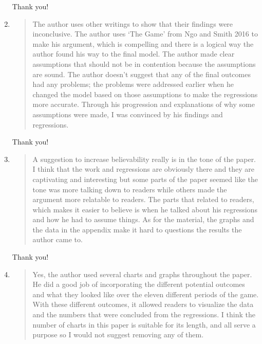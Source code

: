 \documentclass{article}
\newenvironment{itquote}
	{\begin{quote}\itshape}
	{\end{quote}\ignorespacesafterend}
\begin{document}
\begin{enumerate}
\begin{itquote}
				\end{itquote}

				Thank you!

			\item
				
				\begin{itquote}
			
					The author uses other writings to show that their findings were inconclusive. The author uses ‘The Game' from Ngo and Smith 2016 to make his argument, which is compelling and there is a logical way the author found his way to the final model. The author made clear assumptions that should not be in contention because the assumptions are sound. The author doesn't suggest that any of the final outcomes had any problems; the problems were addressed earlier when he changed the model based on those assumptions to make the regressions more accurate. Through his progression and explanations of why some assumptions were made, I was convinced by his findings and regressions.

				\end{itquote}

				Thank you!

			\item
				
				\begin{itquote}
			
					A suggestion to increase believability really is in the tone of the paper. I think that the work and regressions are obviously there and they are captivating and interesting but some parts of the paper seemed like the tone was more talking down to readers while others made the argument more relatable to readers. The parts that related to readers, which makes it easier to believe is when he talked about his regressions and how he had to assume things. As for the material, the graphs and the data in the appendix make it hard to questions the results the author came to.

				\end{itquote}

				Thank you!

			\item

				\begin{itquote}
			
					Yes, the author used several charts and graphs throughout the paper. He did a good job of incorporating the different potential outcomes and what they looked like over the eleven different periods of the game. With these different outcomes, it allowed readers to visualize the data and the numbers that were concluded from the regressions. I think the number of charts in this paper is suitable for its length, and all serve a purpose so I would not suggest removing any of them.


\end{itquote}
\end{enumerate}
\end{document}
